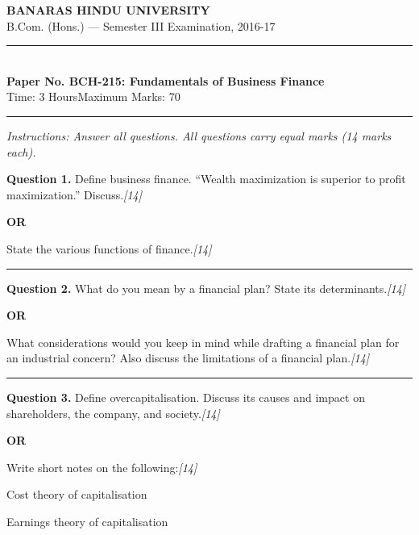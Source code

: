 \documentclass[11pt,a4paper]{article}
\newcommand{\pts}[1]{\hfill   \textit{[#1]}}
\begin{document}
\begin{center}
  {\large\bfseries BANARAS HINDU UNIVERSITY}\\[2pt]
  {\normalsize B.Com. (Hons.) --- Semester III Examination, 2016-17}\\[6pt]
  \rule{0.8\linewidth}{0.5pt}\\[6pt]
  {\large\bfseries Paper No. BCH-215: Fundamentals of Business Finance}\\[4pt]
  {\normalsize Time: 3 Hours\hfill Maximum Marks: 70}
\end{center}

\rule{\linewidth}{0.4pt}

\smallskip



\noindent   \textit{Instructions: Answer all questions. All questions carry equal marks (14 marks each).}

\bigskip




\noindent   \textbf{Question 1.}
Define business finance. ``Wealth maximization is superior to profit maximization.'' Discuss.\pts{14}

\centerline{   \textbf{OR}}

State the various functions of finance.\pts{14}

\medskip\rule{\linewidth}{0.2pt}




\noindent   \textbf{Question 2.}
What do you mean by a financial plan? State its determinants.\pts{14}

\centerline{   \textbf{OR}}

What considerations would you keep in mind while drafting a financial plan for an industrial concern? Also discuss the limitations of a financial plan.\pts{14}

\medskip\rule{\linewidth}{0.2pt}




\noindent   \textbf{Question 3.}
Define overcapitalisation. Discuss its causes and impact on shareholders, the company, and society.\pts{14}

\centerline{   \textbf{OR}}

Write short notes on the following:\pts{14}

\begin{parts}
  \item Cost theory of capitalisation
  \item Earnings theory of capitalisation
\end{parts}
\end{document}
